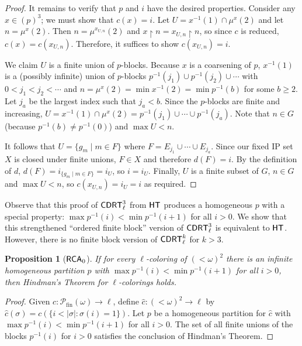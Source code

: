 \documentclass{amsart}
\newtheorem{prop}[thm]{Proposition}
\theoremstyle{definition}
\theoremstyle{remark}
\newcommand{\system}[1]{\mbox{\fontfamily{cmss}\fontshape{n}\fontseries{m}%
    \selectfont#1}}
\newcommand{\RCA}{\system{RCA}\ensuremath{_0}}
\newcommand{\CDRT}{\system{CDRT}}
\newcommand{\HT}{\system{HT}}
\newcommand{\restrict}{\upharpoonright}
\newcommand{\block}[2]{{#1}^{-1}(#2)}
\begin{document}
\begin{proof}
It remains to verify that $p$ and $i$ have the desired
properties. Consider any $x \in (p)^3$; we must show that $c(x) =
i$. Let $U = \block{x}{1} \cap \mu^x(2)$ and let $n = \mu^x(2)$. 
Then $n = \mu^{x_{U,n}}(2)$ and $x \restrict n = x_{U,n}
\restrict n$, so since $c$ is reduced, $c(x) = c(x_{U,n})$. Therefore, it
suffices to show $c(x_{U,n}) = i$.

We claim $U$ is a finite union of $p$-blocks. Because $x$ is a coarsening of $p$, 
$\block{x}{1}$ is a (possibly infinite) union of $p$-blocks $\block{p}{j_1} \cup \block{p}{j_2} \cup \cdots$ 
with $0 < j_1 < j_2 < \cdots$ and $n = \mu^x(2) = \min \block{x}{2} = \min \block{p}{b}$ for some $b \geq 2$. 
Let $j_a$ be the largest index such that $j_a < b$. 
Since the $p$-blocks are finite and increasing, $U = \block{x}{1} \cap \mu^x(2) = \block{p}{j_1} \cup \cdots \cup \block{p}{j_a}$. 
Note that $n \in G$ (because $\block{p}{b} \neq \block{p}{0}$) and $\max U < n$. 

It follows that $U = \{ g_m \mid m \in F \}$ where $F = E_{j_1} \cup \cdots \cup E_{j_a}$. Since our fixed IP set $X$ is 
closed under finite unions, $F \in X$ and therefore $d(F)=i$. By the definition of $d$, 
$d(F) = i_{\{g_m \mid m \in F\}} = i_U$, so $i = i_U$. Finally, $U$ is a finite subset of $G$, $n \in G$ and 
$\max U < n$, so $c(x_{U,n}) = i_U = i$ as required. 
\end{proof}

Observe that this proof of $\CDRT^3_\ell$ from $\HT$ produces a homogeneous $p$ with a special property: 
$\max \block{p}{i} < \min \block{p}{i+1}$ for all $i>0$.
We show that this strengthened ``ordered finite block'' version of $\CDRT^3_\ell$ is equivalent to $\HT$.
However, there is no finite block version of $\CDRT^k_\ell$ for $k>3$.

\begin{prop}[$\RCA$]
\label{prop:2.14}
If for every $\ell$-coloring of $(<\omega)^2$ there is an infinite homogeneous partition $p$ with
$\max \block{p}{i} < \min \block{p}{i+1}$ for all $i>0$, then Hindman's Theorem for $\ell$-colorings holds.
\end{prop}

\begin{proof}
Given $c: \mathcal{P}_{\text{fin}}(\omega) \rightarrow \ell$, define $\widehat{c}: (<\omega)^2 \rightarrow \ell$ by 
$\widehat{c}(\sigma) = c(\{i<|\sigma| : \sigma(i) = 1\})$.  Let $p$ be a homogeneous partition for $\widehat{c}$ with $\max \block{p}{i} < \min \block{p}{i+1}$ for all $i>0$.  
The set of all finite unions of the blocks $\block{p}{i}$ for $i>0$ satisfies the conclusion of Hindman's Theorem.
\end{proof}
\end{document}

